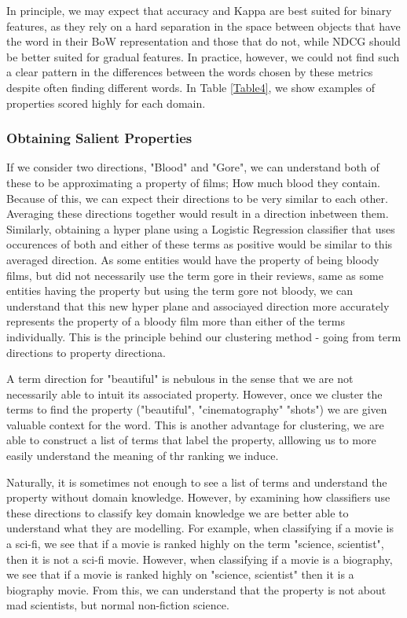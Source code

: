 In principle, we may expect that accuracy and Kappa are best suited for binary features, as they rely on a hard separation in the space between objects that have the word in their BoW representation and those that do not, while NDCG should be better suited for gradual features. In practice, however, we could not find such a clear pattern in the differences between the words chosen by these metrics despite often finding different words. In Table \ref{Table4}, we show examples of properties scored highly for each domain.

\subsubsection{Obtaining Salient Properties}

If we consider two directions, "Blood" and "Gore", we can understand both of these to be approximating a property of films; How much blood they contain. Because of this, we can expect their directions to be very similar to each other. Averaging these directions together would result in a direction inbetween them. Similarly, obtaining a hyper plane using a Logistic Regression classifier that uses occurences of both and either of these terms as positive would be similar to this averaged direction. As some entities would have the property of being bloody films, but did not necessarily use the term gore in their reviews, same as some entities having the property but using the term gore not bloody, we can understand that this new hyper plane and associayed direction more accurately represents the property of a bloody film more than either of the terms individually. This is the principle behind our clustering method - going from term directions to property directiona.

A term direction for "beautiful" is nebulous in the sense that we are not necessarily able to intuit its associated property. However, once we cluster the terms to find the property ("beautiful", "cinematography" "shots") we are given valuable context for the word. This is another advantage for clustering, we are able to construct a list of terms that label the property, alllowing us to more easily understand the meaning of thr ranking we induce.

Naturally, it is sometimes not enough to see a list of terms and understand the property without domain knowledge. However, by examining how classifiers use these directions to classify key domain knowledge we are better able to understand what they are modelling. For example, when classifying if a movie is a sci-fi, we see that if a movie is ranked highly on the term "science, scientist", then it is not a sci-fi movie. However, when classifying if a movie is a biography, we see that if a movie is ranked highly on "science, scientist" then it is a biography movie. From this, we can understand that the property is not about mad scientists, but normal non-fiction science. 

